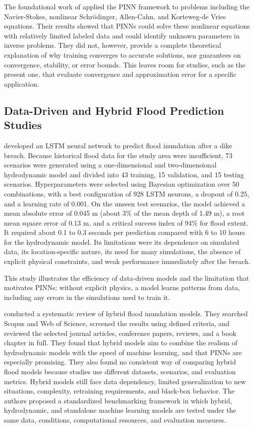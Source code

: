 The foundational work of  applied the PINN framework to problems including the Navier-Stokes, nonlinear Schr\"odinger, Allen-Cahn, and Korteweg-de Vries equations. Their results showed that PINNs could solve these nonlinear equations with relatively limited labeled data and could identify unknown parameters in inverse problems. They did not, however, provide a complete theoretical explanation of why training converges to accurate solutions, nor guarantees on convergence, stability, or error bounds. This leaves room for studies, such as the present one, that evaluate convergence and approximation error for a specific application.

\subsection{Data-Driven and Hybrid Flood Prediction Studies}

 developed an LSTM neural network to predict flood inundation after a dike breach. Because historical flood data for the study area were insufficient, 73 scenarios were generated using a one-dimensional and two-dimensional hydrodynamic model and divided into 43 training, 15 validation, and 15 testing scenarios. Hyperparameters were selected using Bayesian optimization over 50 combinations, with a best configuration of 928 LSTM neurons, a dropout of 0.25, and a learning rate of 0.001. On the unseen test scenarios, the model achieved a mean absolute error of 0.045 m (about 3\% of the mean depth of 1.49 m), a root mean square error of 0.13 m, and a critical success index of 94\% for flood extent. It required about 0.1 to 0.3 seconds per prediction compared with 6 to 10 hours for the hydrodynamic model. Its limitations were its dependence on simulated data, its location-specific nature, its need for many simulations, the absence of explicit physical constraints, and weak performance immediately after the breach.

This study illustrates the efficiency of data-driven models and the limitation that motivates PINNs: without explicit physics, a model learns patterns from data, including any errors in the simulations used to train it.

 conducted a systematic review of hybrid flood inundation models. They searched Scopus and Web of Science, screened the results using defined criteria, and reviewed the selected journal articles, conference papers, reviews, and a book chapter in full. They found that hybrid models aim to combine the realism of hydrodynamic models with the speed of machine learning, and that PINNs are especially promising. They also found no consistent way of comparing hybrid flood models because studies use different datasets, scenarios, and evaluation metrics. Hybrid models still face data dependency, limited generalization to new situations, complexity, retraining requirements, and black-box behavior. The authors proposed a standardized benchmarking framework in which hybrid, hydrodynamic, and standalone machine learning models are tested under the same data, conditions, computational resources, and evaluation measures.

